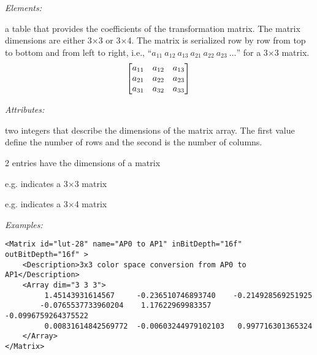  
\emph{Elements:}
\begin{xmlfields}
	\xmlitem[Array][required] 
	a table that provides the coefficients of the transformation matrix. The matrix dimensions are either 3$\times$3 or 3$\times$4. The matrix is serialized row by row from top to bottom and from left to right, i.e., ``$a_{11}\ a_{12}\ a_{13}\ a_{21}\ a_{22}\ a_{23}\ \ldots$'' for a 3$\times$3 matrix.
		\begin{equation}
		    \begin{bmatrix*}
		        a_{11} & a_{12} & a_{13} \\
		        a_{21} & a_{22} & a_{23} \\
		        a_{31} & a_{32} & a_{33} \\
		    \end{bmatrix*} \\
		\end{equation}

    \emph{Attributes:}
    \begin{xmlfields}            
    	\xmlitem[dim][required] 
    	two integers that describe the dimensions of the matrix array. The first value define the number of rows and the second is the number of columns. 
    	
    	2 entries have the dimensions of a matrix
		\begin{list}{}{\setlength{\itemsep}{4pt}\setlength{\topsep}{0pt}}
				\item e.g.  indicates a 3$\times$3 matrix
				\item e.g.  indicates a 3$\times$4 matrix
		\end{list}
	\end{xmlfields}

	
\end{xmlfields}


\emph{Examples:}
\begin{lstlisting}[caption=Example of a \xml{Matrix} node with \xml{dim="3 3 3"}]
<Matrix id="lut-28" name="AP0 to AP1" inBitDepth="16f" outBitDepth="16f" >
	<Description>3x3 color space conversion from AP0 to AP1</Description>
	<Array dim="3 3 3">
         1.45143931614567	  -0.236510746893740	-0.214928569251925
        -0.0765537733960204    1.17622969983357	    -0.0996759264375522
         0.00831614842569772  -0.00603244979102103   0.997716301365324
	</Array>
</Matrix>
\end{lstlisting}

